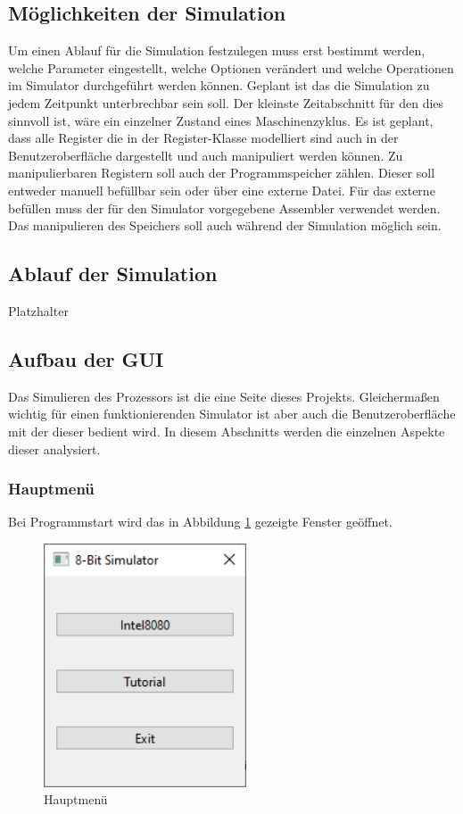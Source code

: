 \documentclass[12pt]{article}
\newcommand{\imgSpaceBefore}{\vspace{10pt}}
\begin{document}
\subsection{Möglichkeiten der Simulation}
Um einen Ablauf für die Simulation festzulegen muss erst bestimmt werden, welche Parameter eingestellt, welche Optionen verändert und welche Operationen im Simulator durchgeführt werden können. Geplant ist das die Simulation zu jedem Zeitpunkt unterbrechbar sein soll. Der kleinste Zeitabschnitt für den dies sinnvoll ist, wäre ein einzelner Zustand eines Maschinenzyklus. Es ist geplant, dass alle Register die in der Register-Klasse modelliert sind auch in der Benutzeroberfläche dargestellt und auch manipuliert werden können. Zu manipulierbaren Registern soll auch der Programmspeicher zählen. Dieser soll entweder manuell befüllbar sein oder über eine externe Datei. Für das externe befüllen muss der für den Simulator vorgegebene Assembler verwendet werden. Das manipulieren des Speichers soll auch während der Simulation möglich sein.

\subsection{Ablauf der Simulation}
Platzhalter

\subsection{Aufbau der GUI}
\label{chp:AufbauGUI}
Das Simulieren des Prozessors ist die eine Seite dieses Projekts. Gleichermaßen wichtig für einen funktionierenden Simulator ist aber auch die Benutzeroberfläche mit der dieser bedient wird. In diesem Abschnitts werden die einzelnen Aspekte dieser analysiert.
\subsubsection{Hauptmenü}
Bei Programmstart wird das in Abbildung \ref{fig:Hauptmenue} gezeigte Fenster geöffnet.\imgSpaceBefore

\begin{figure}[H]
\centering
\includegraphics[width=6cm]{bilder/Hauptmenue}
\caption{Hauptmenü}
\label{fig:Hauptmenue}
\end{figure}
\end{document}

